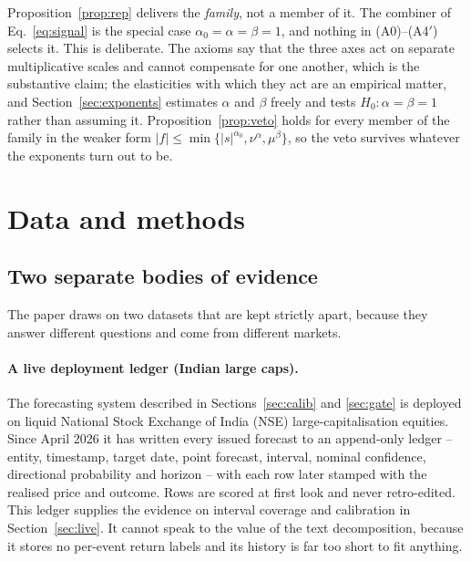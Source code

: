 \begin{remark}\label{rem:notpinned}
Proposition~\ref{prop:rep} delivers the \emph{family}, not a member of it. The
combiner of Eq.~\eqref{eq:signal} is the special case
$\alpha_0=\alpha=\beta=1$, and nothing in (A0)--(A4$'$) selects it. This is
deliberate. The axioms say that the three axes act on separate multiplicative
scales and cannot compensate for one another, which is the substantive claim; the
elasticities with which they act are an empirical matter, and
Section~\ref{sec:exponents} estimates $\alpha$ and $\beta$ freely and tests
$H_0\!:\alpha=\beta=1$ rather than assuming it. Proposition~\ref{prop:veto} holds
for every member of the family in the weaker form
$|f|\le\min\{|s|^{\alpha_0},\nu^{\alpha},\mu^{\beta}\}$, so the veto survives
whatever the exponents turn out to be.
\end{remark}

\section{Data and methods}\label{sec:methods}

\subsection{Two separate bodies of evidence}\label{sec:evidence}

The paper draws on two datasets that are kept strictly apart, because they answer
different questions and come from different markets.

\paragraph{A live deployment ledger (Indian large caps).} The forecasting system
described in Sections~\ref{sec:calib} and \ref{sec:gate} is deployed on liquid
National Stock Exchange of India (NSE) large-capitalisation equities. Since April
2026 it has written every issued forecast to an append-only ledger -- entity,
timestamp, target date, point forecast, interval, nominal confidence, directional
probability and horizon -- with each row later stamped with the realised price and
outcome. Rows are scored at first look and never retro-edited. This ledger
supplies the evidence on interval coverage and calibration in
Section~\ref{sec:live}. It cannot speak to the value of the text decomposition,
because it stores no per-event return labels and its history is far too short to
fit anything.

